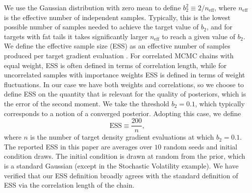 \documentclass[twoside,11pt]{article}
\begin{document}
\begin{table}[]
    \caption{Sampling efficiency (ESS) comparison between automatic tuning MCLMC and NUTS (where the tuning run of 500 steps is included in the sampling cost). Here we use the leapfrog integrator with $q = 0$. Higher is better, the best performers are shown in bold. 
    }
    \label{table2}
\end{table}

We use the Gaussian distribution with 
zero mean to define $b_2^2 \equiv 2 / n_{\text{eff}}$, where $n_{\text{eff}}$ is the effective number of independent samples. Typically, this is the lowest possible 
number of samples needed to achieve the 
target value of $b_2$, and for targets with fat tails it takes significantly larger $n_{\text{eff}}$
to reach a given value of $b_2$.
We define the effective sample size (ESS) as an effective number of samples produced per target gradient evaluation \citep{UsingBias, DLMC}.
For correlated MCMC chains with equal weight, 
ESS is often defined in terms of 
correlation length, while for uncorrelated samples with importance weights ESS is 
defined in terms of weight fluctuations. 
In our case we have both weights and 
correlations, so we choose to define 
ESS on the quantity that is relevant 
for the quality of posteriors, which 
is the error of the second moment. 
We take the threshold $b_2 = 0.1$, 
which typically corresponds to a 
notion of a converged posterior. 
Adopting this case, we define
\begin{equation}
    \text{ESS} \equiv \frac{200}{n},
\end{equation}
where $n$ is the number of target density gradient evaluations at which $b_2 = 0.1$. 
The reported ESS in this paper are averages over $10$ random seeds and initial condition draws. The initial condition is drawn at random from the prior, which is a standard Gaussian (except in the Stochastic Volatility example). We have verified that our ESS
definition broadly agrees with the 
standard definition of ESS via the 
correlation length of the chain.
\end{document}
